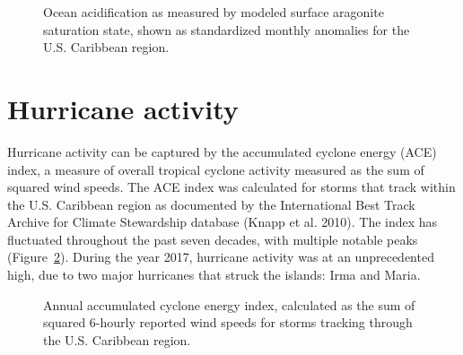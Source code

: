 \documentclass[
  letterpaper,
  oneside,
  open=any]{scrbook}
\begin{document}
\begin{figure}


\caption{\label{fig-OA}Ocean acidification as measured by modeled
surface aragonite saturation state, shown as standardized monthly
anomalies for the U.S. Caribbean region.}

\end{figure}%

\section{Hurricane activity}\label{hurricane-activity}

Hurricane activity can be captured by the accumulated cyclone energy
(ACE) index, a measure of overall tropical cyclone activity measured as
the sum of squared wind speeds. The ACE index was calculated for storms
that track within the U.S. Caribbean region as documented by the
International Best Track Archive for Climate Stewardship database (Knapp
et al. 2010). The index has fluctuated throughout the past seven
decades, with multiple notable peaks (Figure~\ref{fig-ACE}). During the
year 2017, hurricane activity was at an unprecedented high, due to two
major hurricanes that struck the islands: Irma and Maria.

\begin{figure}


\caption{\label{fig-ACE}Annual accumulated cyclone energy index,
calculated as the sum of squared 6-hourly reported wind speeds for
storms tracking through the U.S. Caribbean region.}

\end{figure}%
\end{document}
